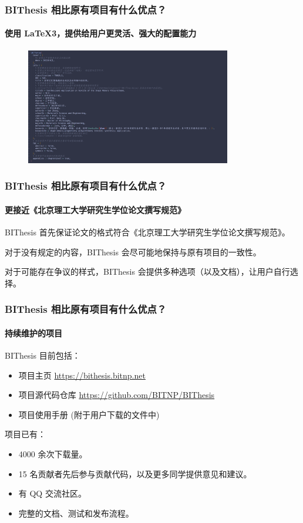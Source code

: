 \documentclass[
  aspectratio=169,
  presentation,
  titlegraphic=./images/bit.png,
  framelogo=./images/bit.png
]{bitbeamer}
\begin{document}
\begin{frame}[t]
  \frametitle{BIThesis 相比原有项目有什么优点？}
  \framesubtitle{使用 LaTeX3，提供给用户更灵活、强大的配置能力}
  
  \vspace{-0.8cm}

  \begin{figure}
    \begin{center}
      \includegraphics[width=0.80\textwidth]{./images/1.png}
    \end{center}
  \end{figure}
  
\end{frame}


\begin{frame}[t]
  \frametitle{BIThesis 相比原有项目有什么优点？}
  \framesubtitle{更接近《北京理工大学研究生学位论文撰写规范》}

  BIThesis 首先保证论文的格式符合《北京理工大学研究生学位论文撰写规范》。
  
  对于没有规定的内容，BIThesis 会尽可能地保持与原有项目的一致性。

  对于可能存在争议的样式，BIThesis 会提供多种选项（以及文档），让用户自行选择。
\end{frame}

\begin{frame}[t]
  \frametitle{BIThesis 相比原有项目有什么优点？}
  \framesubtitle{持续维护的项目}

  BIThesis 目前包括：
  \begin{itemize}
    \item 项目主页 \url{https://bithesis.bitnp.net}
    \item 项目源代码仓库 \url{https://github.com/BITNP/BIThesis}
    \item 项目使用手册 (附于用户下载的文件中)
  \end{itemize}

  \vspace{0.5cm}
  
  项目已有：
  \begin{itemize}
    \item 4000 余次下载量。
    \item 15 名贡献者先后参与贡献代码，以及更多同学提供意见和建议。
    \item 有 QQ 交流社区。
    \item 完整的文档、测试和发布流程。
  \end{itemize}
\end{frame}
\end{document}
